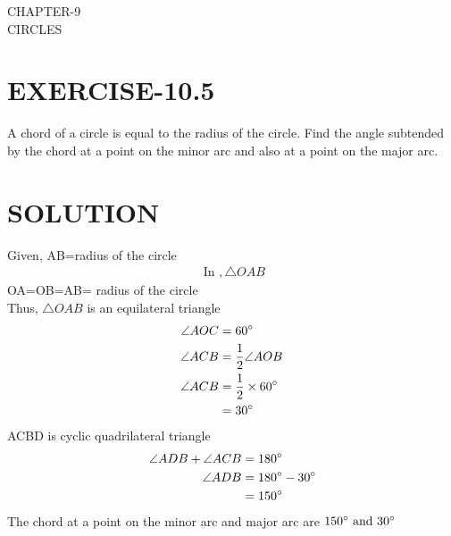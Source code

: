 \documentclass[12pt]{article}
\begin{document}
\begin{center}
\textbf\large{CHAPTER-9 \\ CIRCLES}

\end{center}
\section{EXERCISE-10.5}
A chord of a circle is equal to the radius of the circle. Find the angle subtended by the chord at a point on the minor arc and also at a point on the major arc.
\section{SOLUTION}
Given,
AB=radius of the circle
\begin{align}
\text{ In },\triangle OAB
\end{align}
OA=OB=AB= radius of the circle\\
Thus, $\triangle OAB$ is an equilateral triangle
\begin{align}
\angle AOC&=60\degree\\
\angle ACB&=\frac{1}{2}\angle AOB\\
\angle ACB&=\frac{1}{2}\times 60\degree\\
&=30\degree
\end{align}
ACBD is cyclic quadrilateral triangle
\begin{align}
\angle ADB+\angle ACB&=180 \degree\\
\angle ADB&=180\degree-30\degree\\
&=150\degree
\end{align}
The chord at a point on the minor arc and major arc are $150\degree\text{ and }30\degree$
\end{document}
